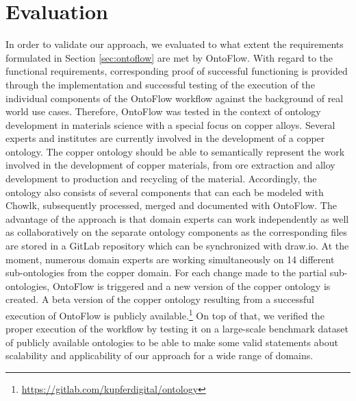 \documentclass[runningheads]{llncs}
\begin{document}
\section{Evaluation}
\label{sec:eval}
In order to validate our approach, we evaluated to what extent the requirements formulated in Section \ref{sec:ontoflow} are met by OntoFlow. With regard to the functional requirements, corresponding proof of successful functioning is provided through the implementation and successful testing of the execution of the individual components of the OntoFlow workflow against the background of real world use cases. Therefore, OntoFlow was tested in the context of ontology development in materials science with a special focus on copper alloys. Several experts and institutes are currently involved in the development of a copper ontology. The copper ontology should be able to semantically represent the work involved in the development of copper materials, from ore extraction and alloy development to production and recycling of the material. Accordingly, the ontology also consists of several components that can each be modeled with Chowlk, subsequently processed, merged and documented with OntoFlow. The advantage of the approach is that domain experts can work independently as well as collaboratively on the separate ontology components as the corresponding files are stored in a GitLab repository which can be synchronized with draw.io. At the moment, numerous domain experts are working simultaneously on 14 different sub-ontologies from the copper domain. For each change made to the partial sub-ontologies, OntoFlow is triggered and a new version of the copper ontology is created. A beta version of the copper ontology resulting from a successful execution of OntoFlow is publicly available.\footnote{\url{https://gitlab.com/kupferdigital/ontology}} 
On top of that, we verified the proper execution of the workflow by testing it on a large-scale benchmark dataset of publicly available ontologies to be able to make some valid statements about scalability and applicability of our approach for a wide range of domains. 
\end{document}

